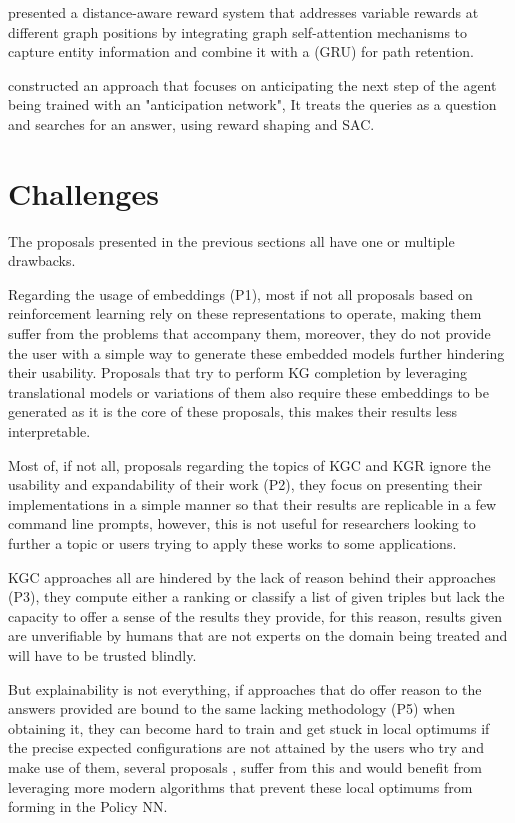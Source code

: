 \citet{tiwari2021dapath} presented a distance-aware reward system that addresses variable rewards at different graph positions by integrating graph self-attention mechanisms to capture entity information and combine it with a (GRU) for path retention.

\citet{cui2023incorporating} constructed an approach that focuses on anticipating the next step of the agent being trained with an "anticipation network", It treats the queries as a question and searches for an answer, using reward shaping and SAC.

\section{Challenges}\label{sec:moti-discussion}

The proposals presented in the previous sections all have one or multiple drawbacks.

Regarding the usage of embeddings (P1), most if not all proposals based on reinforcement learning rely on these representations to operate, making them suffer from the problems that accompany them, moreover, they do not provide the user with a simple way to generate these embedded models further hindering their usability. Proposals that try to perform KG completion by leveraging translational models or variations of them also require these embeddings to be generated as it is the core of these proposals, this makes their results less interpretable.

Most of, if not all, proposals regarding the topics of KGC and KGR ignore the usability and expandability of their work (P2), they focus on presenting their implementations in a simple manner so that their results are replicable in a few command line prompts, however, this is not useful for researchers looking to further a topic or users trying to apply these works to some applications.

KGC approaches \cite{nickel2011three, bordes2013translating, wang2014knowledge,vashishth2020interacte} all are hindered by the lack of reason behind their approaches (P3), they compute either a ranking or classify a list of given triples but lack the capacity to offer a sense of the results they provide, for this reason, results given are unverifiable by humans that are not experts on the domain being treated and will have to be trusted blindly.

But explainability is not everything, if approaches that do offer reason to the answers provided are bound to the same lacking methodology (P5) when obtaining it, they can become hard to train and get stuck in local optimums if the precise expected configurations are not attained by the users who try and make use of them, several proposals \cite{}, suffer from this and would benefit from leveraging more modern algorithms that prevent these local optimums from forming in the Policy NN.

